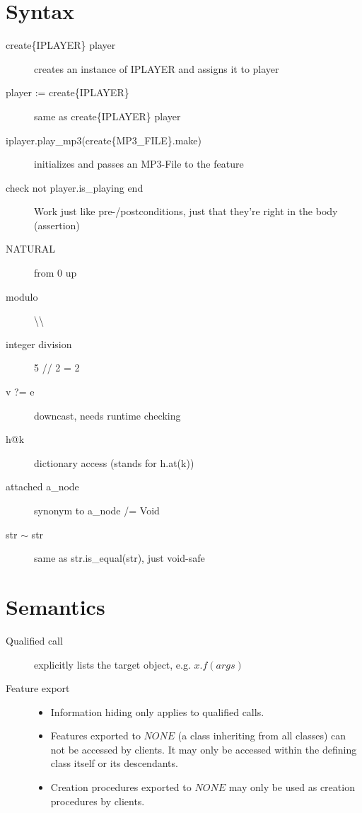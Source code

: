 \documentclass[11pt]{article}
\begin{document}
\section{Syntax}

\begin{description}
	\item[create\{IPLAYER\} player] creates an instance of IPLAYER and assigns it to player
	\item[player := create\{IPLAYER\}] same as create\{IPLAYER\} player
	\item[iplayer.play\_mp3(create\{MP3\_FILE\}.make)] initializes and passes an MP3-File to the feature
	\item[check not player.is\_playing end] Work just like pre-/postconditions, just that they're right in the body (assertion)
	\item[NATURAL] from 0 up
	\item[modulo] \textbackslash\textbackslash
	\item[integer division] 5 // 2 = 2
	\item[v ?= e] downcast, needs runtime checking
	\item[h@k] dictionary access (stands for h.at(k))
	\item[attached a\_node] synonym to a\_node /= Void
	\item[str $\sim$ str] same as str.is\_equal(str), just void-safe
\end{description}

\section{Semantics}

\begin{description}
	\item[Qualified call] explicitly lists the target object, e.g. $x.f(args)$
	\item[Feature export]
	\begin{itemize}
		\item Information hiding only applies to qualified calls. 
		\item Features exported to $NONE$ (a class inheriting from all classes) can not be accessed by clients. It may only be accessed within the defining class itself or its descendants.
		\item Creation procedures exported to $NONE$ may only be used as creation procedures by clients.
	\end{itemize}
\end{description}
\end{document}
